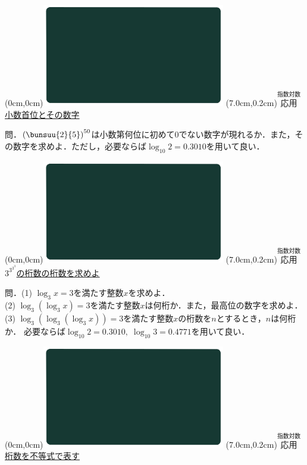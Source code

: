 \documentclass[10pt,
fleqn,
dvipdfmx,
uplatex
]{jsarticle}
\begin{document}
\at(0cm,0cm){\includegraphics[width=8cm,bb=0 0 1920 1080]{./youtube/thumbnails/templates/smart_background/指数対数.jpeg}}
\at(7.0cm,0.2cm){\small\color{bradorange}$\overset{\text{指数対数}}{\text{応用}}$}
{\color{orange}\LARGE\underline{小数首位とその数字}}\vspace{0.3zw}

\Large 
問．$\left(\bunsuu{2}{5}\right)^{50}$は小数第何位に初めて$0$でない数字が現れるか．また，その数字を求めよ．ただし，必要ならば$\log _{10}2=0.{3010}$を用いて良い．


\newpage



\at(0cm,0cm){\includegraphics[width=8cm,bb=0 0 1920 1080]{./youtube/thumbnails/templates/smart_background/指数対数.jpeg}}
\at(7.0cm,0.2cm){\small\color{bradorange}$\overset{\text{指数対数}}{\text{応用}}$}
{\color{orange}\Large\underline{$3^{3^{3^3}}$の桁数の桁数を求めよ}}\vspace{0.3zw}

\small 
問．(1)  $\log _3x=3$を満たす整数$x$を求めよ．\\
(2)  $\log _3\left(\log _3x\right)=3$を満たす整数$x$は何桁か．また，最高位の数字を求めよ．\\
(3)  $\log _3\left(\log _3\left(\log _3x\right)\right)=3$を満たす整数$x$の桁数を$n$とするとき，$n$は何桁か．
必要ならば$\log _{10}2=0.{3010},\;\log _{10}3=0.{4771}$を用いて良い．\\



\newpage



\at(0cm,0cm){\includegraphics[width=8cm,bb=0 0 1920 1080]{./youtube/thumbnails/templates/smart_background/指数対数.jpeg}}
\at(7.0cm,0.2cm){\small\color{bradorange}$\overset{\text{指数対数}}{\text{応用}}$}
{\color{orange}\LARGE\underline{桁数を不等式で表す}}\vspace{0.3zw}
\end{document}

